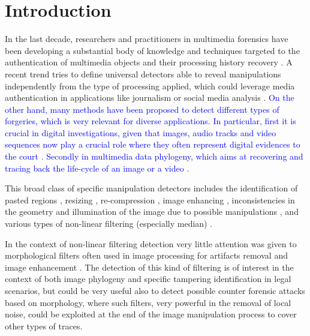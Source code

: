 \documentclass{ieeeaccess}
\newcommand{\revisedtext}[1]{\textcolor{blue}{#1}}
\begin{document}
\titlepgskip=-15pt

\maketitle

\section{Introduction}
\label{sec:intro}

In the last decade, researchers and practitioners in multimedia forensics have been developing a substantial body of knowledge and techniques targeted to the authentication of multimedia objects and their processing history recovery \cite{stamm_overview, farid_book, ho, piva_overview, sencar_book}. 
A recent trend tries to define universal detectors able to reveal manipulations independently from the type of processing applied, which could leverage media authentication in applications like journalism or social media analysis \cite{noiseprint}. 
\revisedtext{On the other hand, many methods have been proposed to detect different types of forgeries, which is very relevant for diverse applications. In particular, first it is crucial in digital investigations, given that images, audio tracks and video sequences now play a crucial role where they often represent digital evidences to the court \cite{forlab}. Secondly in multimedia data phylogeny, which aims at recovering and tracing back the life-cycle of an image or a video \cite{Bestagini2016, Dias2012, Oliveira2016, Costa2014}.}

This broad class of specific manipulation detectors includes the identification of pasted regions \cite{cm2, cm3, cm4, spl2, spl3}, resizing \cite{fernando2017, PB-TIFS-2019}, re-compression \cite{PBPG2017-TIFS},  image enhancing \cite{shan2019robust}, inconsistencies in the geometry and illumination of the image due to possible manipulations \cite{geom1, geom2, phys1}, and various types of non-linear filtering (especially median) \cite{Bahrami2015, Cao2014, Cao2011, Fridrich2010, Tian2010, Yuan:2011, Liu2013, Huang2013, Shi2014, Wang2015, Pasquini2016-TIFS, gao2019robust}. 

In the context of non-linear filtering detection 
very little attention was given to morphological filters \cite{haas1967morphologie} often used in image processing for artifacts removal and image enhancement \cite{British2012} \cite{Maragos2004}. The detection of this kind of filtering is of interest in the context of both image phylogeny and specific tampering identification in legal scenarios, but could be very useful also to detect possible counter forensic attacks based on morphology, where such filters, very powerful in the removal of local noise, could be exploited at the end of the image manipulation process to cover other types of traces. 
\end{document}
